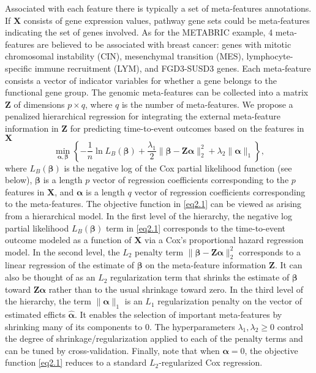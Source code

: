 Associated with each feature there is typically a set of meta-features annotations. If $\bm{X}$ consists of gene expression values, pathway gene sets could be meta-features indicating the set of genes involved. As for the METABRIC example, 4 meta-features are believed to be associated with breast cancer: genes with mitotic chromosomal instability (CIN), mesenchymal transition (MES), lymphocyte-specific immune recruitment (LYM), and FGD3-SUSD3 genes. Each meta-feature consists a vector of indicator variables for whether a gene belongs to the functional gene group. The genomic meta-features can be collected into a matrix $\bm{Z}$ of dimensions $p\times q$, where $q$ is the number of meta-features. We propose a penalized hierarchical regression for integrating the external meta-feature information in $\bm{Z}$ for predicting time-to-event outcomes based on the features in $\bm{X}$
\begin{equation}
    \min_{\bm{\alpha},\bm{\beta}} \left\{ -\frac{1}{n}\ln{L_B(\bm{\beta})}+\frac{\lambda_1}{2}\|\bm{\beta}-\bm{Z\alpha}\|_2^2+\lambda_2\|\bm{\alpha}\|_1 \right\}, \label{eq2.1}
\end{equation}
where $L_B(\bm{\beta})$ is the negative log of the Cox partial likelihood function (see below), $\bm{\beta}$ is a length $p$ vector of regression coefficients corresponding to the $p$ features in $\bm{X}$, and $\bm{\alpha}$ is a length $q$ vector of regression coefficients corresponding to the meta-features. The objective function in \eqref{eq2.1} can be viewed as arising from a hierarchical model. In the first level of the hierarchy, the negative log partial likelihood $L_B(\bm{\beta})$ term in \eqref{eq2.1} corresponds to the time-to-event outcome modeled as a function of $\bm{X}$ via a Cox’s proportional hazard regression model. In the second level, the $L_2$ penalty term $\|\bm{\beta}-\bm{Z\alpha}\|_2^2$ corresponds to a linear regression of the estimate of $\bm{\beta}$ on the meta-feature information $\bm{Z}$. It can also be thought of as an $L_2$ regularization term that shrinks the estimate of $\bm{\beta}$ toward $\bm{Z\alpha}$ rather than to the usual shrinkage toward zero. In the third level of the hierarchy, the term $\|\bm{\alpha}\|_1$ is an $L_1$ regularization penalty on the vector of estimated efficts $\hat{\bm{\alpha}}$. It enables the selection of important meta-features by shrinking many of its components to $0$. The hyperparameters $\lambda_1,\lambda_2\geq0$ control the degree of shrinkage/regularization applied to each of the penalty terms and can be tuned by cross-validation. Finally, note that when $\bm{\alpha}=0$, the objective function \eqref{eq2.1} reduces to a standard $L_2$-regularized Cox regression.

